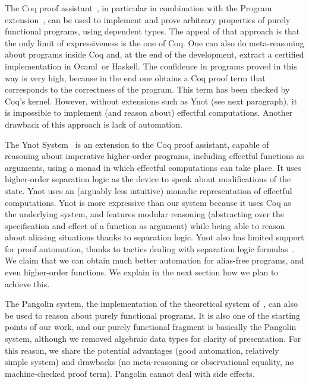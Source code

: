 \documentclass[a4paper]{llncs}
\newcommand{\ocaml}{Ocaml}
\begin{document}
The Coq proof assistant~\cite{CoqManualV81}, in particular in combination with
the Program extension~\cite{sozeau07icfp}, can be used to implement and prove
arbitrary properties of purely functional programs, using dependent types. The
appeal of that approach is that the only limit of expressiveness is the one of
Coq. One can also do meta-reasoning about programs inside Coq and, at the end
of the development, extract a certified implementation in \ocaml\ or Haskell.
The confidence in programs proved in this way is very high, because in the end
one obtains a Coq proof term that corresponds to the correctness of the
program. This term has been checked by Coq's kernel. However, without
extensions such as Ynot (see next paragraph), it is impossible to implement
(and reason about) effectful computations. Another drawback of this approach
is lack of automation.

The Ynot System~\cite{Nanevski08Awkward,chlipalaicfp09} is an extension to the
Coq proof assistant, capable of reasoning about imperative higher-order
programs, including effectful functions as arguments, using a monad in which
effectful computations can take place. It uses higher-order separation logic
as the device to speak about modifications of the state. Ynot uses an
(arguably less intuitive) monadic representation of effectful computations.
Ynot is more expressive than our system because it uses Coq as the underlying
system, and features modular reasoning (abstracting over the specification and
effect of a function as argument) while being able to reason about aliasing
situations thanks to separation logic. Ynot also has limited support for
proof automation, thanks to tactics dealing with separation logic
formulas~\cite{chlipalaicfp09}. We claim that we can obtain much better
automation for alias-free programs, and even higher-order functions. We
explain in the next section how we plan to achieve this.

The Pangolin system, the implementation of the theoretical system
of~\cite{regis-gianas-pottier-08}, can also be used to reason about
purely functional programs. It is also one of the starting points of
our work, and our purely functional fragment is basically the Pangolin
system, although we removed algebraic data types for clarity of
presentation. For this reason, we share the potential advantages (good
automation, relatively simple system) and drawbacks (no
meta-reasoning or observational equality, no machine-checked proof
term). Pangolin cannot deal with side effects.
\end{document}
